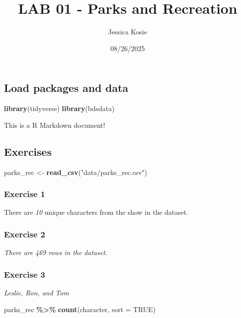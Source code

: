 \documentclass[
]{article}
\title{LAB 01 - Parks and Recreation}
\author{Jessica Kosie}
\date{08/26/2025}
\newenvironment{Shaded}{\begin{snugshade}}{\end{snugshade}}
\newcommand{\AttributeTok}[1]{\textcolor[rgb]{0.13,0.29,0.53}{#1}}
\newcommand{\ConstantTok}[1]{\textcolor[rgb]{0.56,0.35,0.01}{#1}}
\newcommand{\FunctionTok}[1]{\textcolor[rgb]{0.13,0.29,0.53}{\textbf{#1}}}
\newcommand{\NormalTok}[1]{#1}
\newcommand{\OtherTok}[1]{\textcolor[rgb]{0.56,0.35,0.01}{#1}}
\newcommand{\SpecialCharTok}[1]{\textcolor[rgb]{0.81,0.36,0.00}{\textbf{#1}}}
\newcommand{\StringTok}[1]{\textcolor[rgb]{0.31,0.60,0.02}{#1}}
\begin{document}
\maketitle

\subsection{Load packages and data}\label{load-packages-and-data}

\begin{Shaded}
\begin{Highlighting}[]
\FunctionTok{library}\NormalTok{(tidyverse)}
\FunctionTok{library}\NormalTok{(bdsdata)}
\end{Highlighting}
\end{Shaded}

This is a R Markdown document!

\subsection{Exercises}\label{exercises}

\begin{Shaded}
\begin{Highlighting}[]
\NormalTok{parks\_rec }\OtherTok{\textless{}{-}} \FunctionTok{read\_csv}\NormalTok{(}\StringTok{"data/parks\_rec.csv"}\NormalTok{)}
\end{Highlighting}
\end{Shaded}

\subsubsection{Exercise 1}\label{exercise-1}

There are \emph{10} unique characters from the show in the dataset.

\subsubsection{Exercise 2}\label{exercise-2}

\emph{There are 469 rows in the dataset.}

\subsubsection{Exercise 3}\label{exercise-3}

\emph{Leslie, Ron, and Tom}

\begin{Shaded}
\begin{Highlighting}[]
\NormalTok{parks\_rec }\SpecialCharTok{\%\textgreater{}\%}
  \FunctionTok{count}\NormalTok{(character, }\AttributeTok{sort =} \ConstantTok{TRUE}\NormalTok{)}
\end{Highlighting}
\end{Shaded}
\end{document}
